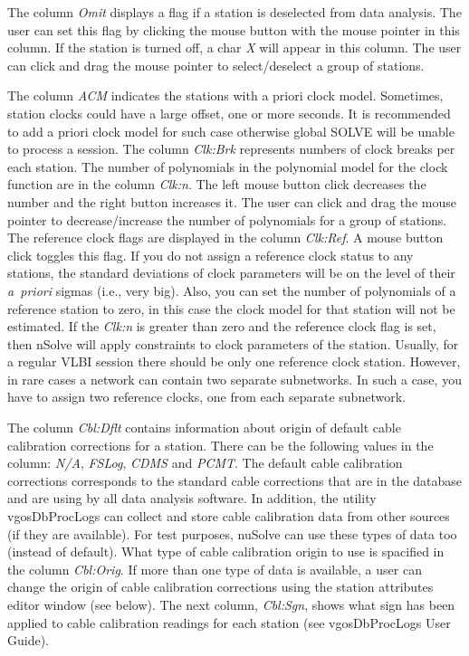 \documentclass [10pt,letterpaper]{report}
\newcommand{\nuSolve}{\greektext n\latintext Solve}
\begin{document}
The column {\sl Omit} displays a flag if a station is deselected from
data analysis. The user can set this flag by clicking the mouse button
with the mouse pointer in this column. If the station is turned off, a
char {\sl X} will appear in this column. The user can click and drag
the mouse pointer to select/deselect a group of stations.

The column {\sl ACM} indicates the stations with a priori clock
model. Sometimes, station clocks could have a large offset, one or more
seconds. It is recommended to add a priori clock model for such case
otherwise global SOLVE will be unable to process a session. The column
{\sl Clk:Brk} represents numbers of clock breaks per each station.
The number of polynomials in the polynomial model for the clock function
are in the column {\sl Clk:n}. The left mouse button click
decreases the number and the right button increases it. The user can
click and drag the mouse pointer to decrease/increase the number of
polynomials for a group of stations.
The reference clock flags are displayed in the column {\sl Clk:Ref}.
A mouse button click toggles this flag. If you do not assign a reference
clock status to any stations, the standard deviations of clock
parameters will be on the level of their {\it a~priori} sigmas (i.e.,
very big). Also, you can set the number of polynomials of a reference
station to zero, in this case the clock model for that station will not
be estimated. If the {\sl Clk:n} is greater than zero and the
reference clock flag is set, then \nuSolve{} will apply constraints to
clock parameters of the station. Usually, for a regular VLBI session
there should be only one reference clock station. However, in rare cases
a network can contain two separate subnetworks. In such a case, you have
to assign two reference clocks, one from each separate subnetwork.

The column {\sl Cbl:Dflt} contains information about origin of default
cable calibration corrections for a station. There can be the following
values in the column: {\sl N/A}, {\sl FSLog}, {\sl CDMS} and
{\sl PCMT}. The default cable calibration corrections corresponds to the
standard cable corrections that are in the database and are using by all
data analysis software. In addition, the utility vgosDbProcLogs can collect
and store cable calibration data from other sources (if they are available).
For test purposes, nuSolve can use these types of data too (instead of
default). What type of cable calibration origin to use is spacified in
the column {\sl Cbl:Orig}. If more than one type of data is available,
a user can change the origin of cable calibration corrections using
the station attributes editor window (see below).
The next column, {\sl Cbl:Sgn}, shows what sign has been applied to
cable calibration readings for each station (see vgosDbProcLogs User
Guide).
\end{document}

